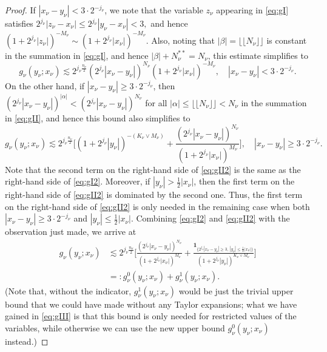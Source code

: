 \documentclass[11pt, reqno]{amsart}
\theoremstyle{definition}
\theoremstyle{remark}
\numberwithin{equation}{section}
\newcommand{\one}{\mathbf{1}}
\newcommand{\abs}[1]{|#1|}
\begin{document}
\begin{proof}
If $\abs{x_\nu-y_\nu}<3\cdot 2^{-j_\nu}$, we note that the variable $z_\nu$ appearing in \eqref{eq:gI} satisfies
$2^{j_\nu}\abs{z_\nu-x_\nu}\leq 2^{j_\nu}\abs{y_\nu-x_\nu}<3,$
and hence $(1+2^{j_\nu}\abs{z_\nu})^{-M_\nu}\sim (1+2^{j_\nu}\abs{x_\nu})^{-M_\nu}$.
Also, noting that $\abs{\beta}=\lfloor\!\lfloor N_\nu\rfloor\!\rfloor$ is constant in the summation in \eqref{eq:gI},
and hence $|\beta|+N_{\nu}^{**}=N_{\nu}$, this estimate simplifies to
\begin{equation}\label{eq:gI2}
  g_\nu(y_\nu;x_\nu)\lesssim
  2^{j_\nu\frac{n_\nu}{2}}(2^{j_\nu}\abs{x_\nu-y_\nu})^{N_\nu}(1+2^{j_\nu}\abs{x_\nu})^{-M_\nu},\quad
  \abs{x_\nu-y_\nu}<3\cdot 2^{-j_\nu}.
\end{equation}
On the other hand, if $\abs{x_\nu-y_\nu}\geq 3\cdot 2^{-j_\nu}$, then $(2^{j_\nu}\abs{x_\nu-y_\nu})^{\abs{\alpha}}<(2^{j_\nu}\abs{x_\nu-y_\nu})^{N_\nu}$
for all $\abs{\alpha}\leq \lfloor\!\lfloor N_\nu\rfloor\!\rfloor<N_\nu$ in the summation in \eqref{eq:gII}, and hence this bound also simplifies to
\begin{equation}\label{eq:gII2}
  g_\nu(y_\nu;x_\nu)\lesssim
   2^{j_\nu\frac{n_\nu}{2}}\bigg[(1+2^{j_\nu}\abs{y_\nu})^{-(K_\nu\vee M_\nu)}
   +\frac{ (2^{j_\nu}\abs{x_\nu-y_\nu})^{N_\nu} }{(1+2^{j_\nu}\abs{x_\nu})^{M_\nu} }\bigg],\quad
  \abs{x_\nu-y_\nu}\geq 3\cdot 2^{-j_\nu}.
\end{equation}
Note that the second term on the right-hand side of \eqref{eq:gII2} is the same as the right-hand side of \eqref{eq:gI2}. Moreover, if $\abs{y_\nu}>\frac12\abs{x_\nu}$, then the first term on the right-hand side of \eqref{eq:gII2} is dominated by the second one. Thus, the first term on the right-hand side of \eqref{eq:gII2} is only needed in the remaining case when both $\abs{x_\nu-y_\nu}\geq 3\cdot 2^{-j_\nu}$ and $\abs{y_\nu}\leq\frac12\abs{x_\nu}$.
Combining \eqref{eq:gI2} and \eqref{eq:gII2} with the observation just made, we arrive at
\begin{equation}\label{eq:gIII}
\begin{split}
  g_\nu(y_\nu;x_\nu)
  &\lesssim 2^{j_\nu\frac{n_\nu}{2}} \Bigg[
  \frac{ (2^{j_\nu}\abs{x_\nu-y_\nu})^{N_\nu} }{ (1+2^{j_\nu}\abs{x_\nu})^{M_\nu}}
  +\frac{\one_{\{2^{j_\nu}\abs{x_\nu-y_\nu}\geq 3,\ \abs{y_\nu}\leq\frac12\abs{x_\nu}\}}}{(1+2^{j_\nu}\abs{y_\nu})^{K_\nu\vee M_\nu}}\Bigg] \\
  &=:g_\nu^0(y_\nu;x_\nu)+g_\nu^1(y_\nu;x_\nu).
\end{split}
\end{equation}
(Note that, without the indicator, $g^1_\nu(y_\nu;x_\nu)$ would be just the trivial upper bound that we could have made without any Taylor expansions; what we have gained in \eqref{eq:gIII} is that this bound is only needed for restricted values of the variables, while otherwise we can use the new upper bound $g_\nu^0(y_\nu;x_\nu)$ instead.)


\end{proof}
\end{document}
